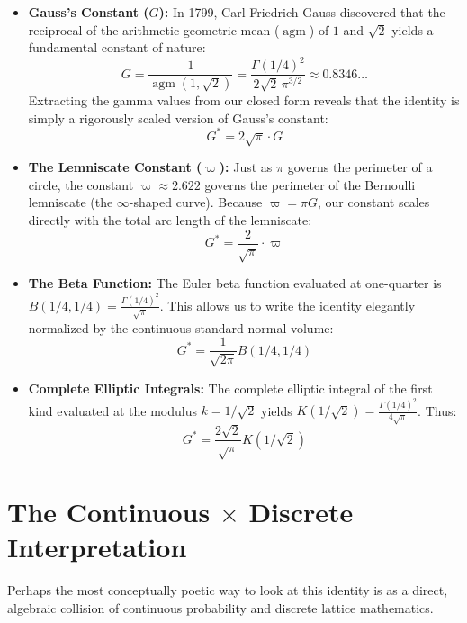 \documentclass[11pt]{article}
\begin{document}
\begin{itemize}
    \item \textbf{Gauss's Constant ($G$):} In 1799, Carl Friedrich Gauss discovered that the reciprocal of the arithmetic-geometric mean ($\operatorname{agm}$) of $1$ and $\sqrt{2}$ yields a fundamental constant of nature:
    \begin{equation*}
        G = \frac{1}{\operatorname{agm}(1, \sqrt{2})} = \frac{\Gamma(1/4)^2}{2\sqrt{2}\,\pi^{3/2}} \approx 0.8346\dots
    \end{equation*}
    Extracting the gamma values from our closed form reveals that the identity is simply a rigorously scaled version of Gauss's constant:
    \begin{equation}
        G^* = 2\sqrt{\pi} \cdot G
    \end{equation}

    \item \textbf{The Lemniscate Constant ($\varpi$):} Just as $\pi$ governs the perimeter of a circle, the constant $\varpi \approx 2.622$ governs the perimeter of the Bernoulli lemniscate (the $\infty$-shaped curve). Because $\varpi = \pi G$, our constant scales directly with the total arc length of the lemniscate:
    \begin{equation}
        G^* = \frac{2}{\sqrt{\pi}} \cdot \varpi
    \end{equation}

    \item \textbf{The Beta Function:} The Euler beta function evaluated at one-quarter is $B(1/4, 1/4) = \frac{\Gamma(1/4)^2}{\sqrt{\pi}}$. This allows us to write the identity elegantly normalized by the continuous standard normal volume:
    \begin{equation}
        G^* = \frac{1}{\sqrt{2\pi}} B(1/4, 1/4)
    \end{equation}

    \item \textbf{Complete Elliptic Integrals:} The complete elliptic integral of the first kind evaluated at the modulus $k=1/\sqrt{2}$ yields $K(1/\sqrt{2}) = \frac{\Gamma(1/4)^2}{4\sqrt{\pi}}$. Thus:
    \begin{equation}
        G^* = \frac{2\sqrt{2}}{\sqrt{\pi}} K(1/\sqrt{2})
    \end{equation}
\end{itemize}

\section{The Continuous $\times$ Discrete Interpretation}
Perhaps the most conceptually poetic way to look at this identity is as a direct, algebraic collision of continuous probability and discrete lattice mathematics.
\end{document}
